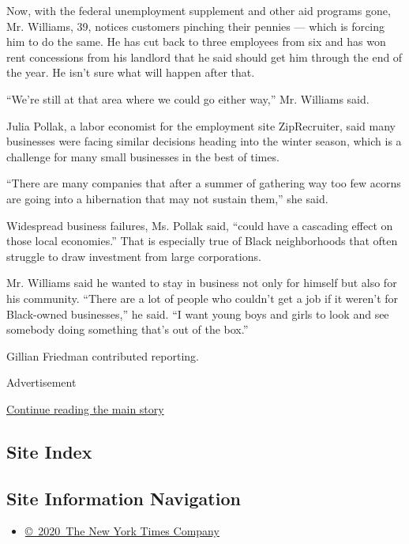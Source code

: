 Now, with the federal unemployment supplement and other aid programs
gone, Mr. Williams, 39, notices customers pinching their pennies ---
which is forcing him to do the same. He has cut back to three employees
from six and has won rent concessions from his landlord that he said
should get him through the end of the year. He isn't sure what will
happen after that.

``We're still at that area where we could go either way,'' Mr. Williams
said.

Julia Pollak, a labor economist for the employment site ZipRecruiter,
said many businesses were facing similar decisions heading into the
winter season, which is a challenge for many small businesses in the
best of times.

``There are many companies that after a summer of gathering way too few
acorns are going into a hibernation that may not sustain them,'' she
said.

Widespread business failures, Ms. Pollak said, ``could have a cascading
effect on those local economies.'' That is especially true of Black
neighborhoods that often struggle to draw investment from large
corporations.

Mr. Williams said he wanted to stay in business not only for himself but
also for his community. ``There are a lot of people who couldn't get a
job if it weren't for Black-owned businesses,'' he said. ``I want young
boys and girls to look and see somebody doing something that's out of
the box.''

Gillian Friedman contributed reporting.

Advertisement

\protect\hyperlink{after-bottom}{Continue reading the main story}

\hypertarget{site-index}{%
\subsection{Site Index}\label{site-index}}

\hypertarget{site-information-navigation}{%
\subsection{Site Information
Navigation}\label{site-information-navigation}}

\begin{itemize}
\tightlist
\item
  \href{https://help.nytimes3xbfgragh.onion/hc/en-us/articles/115014792127-Copyright-notice}{©~2020~The
  New York Times Company}
\end{itemize}


